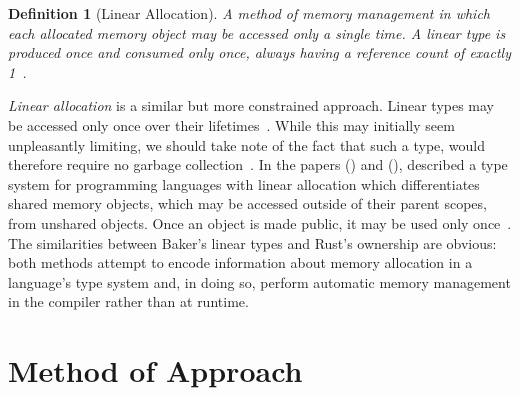 \documentclass[11pt]{article}
\theoremstyle{break}
\newtheorem{defn}{Definition}
\begin{document}
\begin{defn}[Linear Allocation]
A method of memory management in which each allocated memory object may be accessed only a single time. A linear type is produced once and consumed only once, always having a reference count of exactly 1~\cite{Baker:1992:LLL:142137.142162,hawblitzel2004low,Baker:1995:UVL:199818.199860}.
\end{defn}

\textit{Linear allocation} is a similar but more constrained approach. Linear types may be accessed only once over their lifetimes~\cite{Baker:1992:LLL:142137.142162,hawblitzel2004low,Baker:1995:UVL:199818.199860}. While this may initially seem unpleasantly limiting, we should take note of the fact that such a type, would therefore require no garbage collection~\cite{Baker:1992:LLL:142137.142162,Baker:1995:UVL:199818.199860}. In the papers  (\citeyear{Baker:1992:LLL:142137.142162}) and  (\citeyear{Baker:1995:UVL:199818.199860}), \citeauthor{Baker:1992:LLL:142137.142162} described a type system for programming languages with linear allocation which differentiates shared memory objects, which may be accessed outside of their parent scopes, from unshared objects. Once an object is made public, it may be used only once~\cite{Baker:1995:UVL:199818.199860,Baker:1992:LLL:142137.142162}. The similarities between Baker's linear types and Rust's ownership are obvious: both methods attempt to encode information about memory allocation in a language's type system and, in doing so, perform automatic memory management in the compiler rather than at runtime.





\vspace*{-.2in}
\section{Method of Approach}
\label{sec:method}
\vspace*{-.1in}
\end{document}
